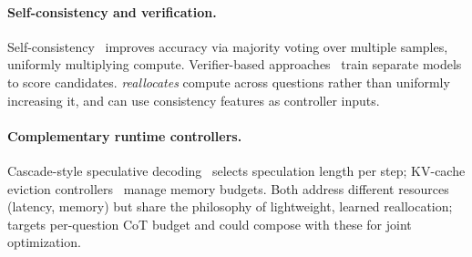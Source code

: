 \paragraph{Self-consistency and verification.}
Self-consistency~\citep{wang2023selfconsistency} improves accuracy via majority voting over multiple samples, uniformly multiplying compute.
Verifier-based approaches~\citep{cobbe2021training,lightman2024lets} train separate models to score candidates.
\adathink{} \emph{reallocates} compute across questions rather than uniformly increasing it, and can use consistency features as controller inputs.

\paragraph{Complementary runtime controllers.}
Cascade-style speculative decoding~\citep{chen2023accelerating} selects speculation length per step; KV-cache eviction controllers~\citep{zhang2024h2o} manage memory budgets.
Both address different resources (latency, memory) but share the philosophy of lightweight, learned reallocation; \adathink{} targets per-question CoT budget and could compose with these for joint optimization.

